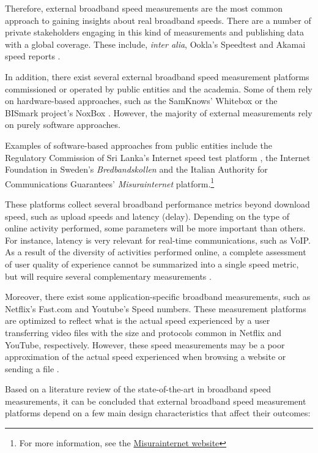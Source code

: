 \documentclass[12pt]{article}
\begin{document}
Therefore, external broadband speed measurements are the most common approach to gaining insights about real broadband speeds. There are a number of private stakeholders engaging in this kind of measurements and publishing data with a global coverage. These include, \textit{inter alia}, Ookla's Speedtest and Akamai speed reports \citep{bauer2010,lehr2013,bauer2016}. 

In addition, there exist several external broadband speed measurement platforms commissioned or operated by public entities and the academia. Some of them rely on hardware-based approaches, such as the SamKnows' Whitebox \citep{samknows2012,samknows2013} or the BISmark project's NoxBox \citep{sundaresan2012,sundaresan2014}. However, the majority of external measurements rely on purely software approaches. 

Examples of software-based approaches from public entities include the Regulatory Commission of Sri Lanka's Internet speed test platform \citep{zuhyle2015}, the Internet Foundation in Sweden's \textit{Bredbandskollen} and the Italian Authority for Communications Guarantees' \textit{Misurainternet} platform.\footnote{For more information, see the \href{https://www.misurainternet.it/}{Misurainternet website}}

These platforms collect several broadband performance metrics beyond download speed, such as upload speeds and latency (delay). Depending on the type of online activity performed, some parameters will be more important than others. For instance, latency is very relevant for real-time communications, such as VoIP. As a result of the diversity of activities performed online, a complete assessment of user quality of experience cannot be summarized into a single speed metric, but will require several complementary measurements \citep{samknows2013,zuhyle2015}. 

Moreover, there exist some application-specific broadband measurements, such as Netflix's Fast.com and Youtube's Speed numbers. These measurement platforms are optimized to reflect what is the actual speed experienced by a user transferring video files with the size and protocols common in Netflix and YouTube, respectively. However, these speed measurements may be a poor approximation of the actual speed experienced when browsing a website or sending a file \citep{bauer2010, bauer2016}.         

Based on a literature review of the state-of-the-art in broadband speed measurements, it can be concluded that external broadband speed measurement platforms depend on a few main design characteristics that affect their outcomes:
\end{document}
